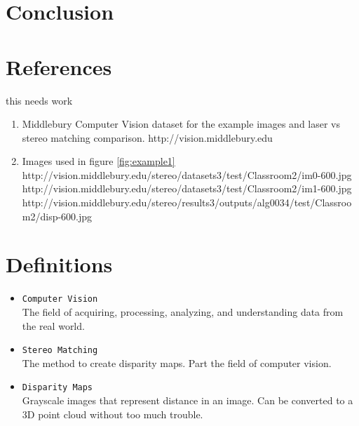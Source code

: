 \documentclass[11pt,fleqn]{article}
\begin{document}
\section{Conclusion}

\newpage
\begin{appendices}

\section{References}

this needs work

\begin{enumerate}

\item Middlebury Computer Vision dataset for the example images and laser vs stereo matching comparison.  
\small
http://vision.middlebury.edu
\normalsize

\item Images used in figure \ref{fig:example1}\\  
\small
http://vision.middlebury.edu/stereo/datasets3/test/Classroom2/im0-600.jpg\\
http://vision.middlebury.edu/stereo/datasets3/test/Classroom2/im1-600.jpg\\
http://vision.middlebury.edu/stereo/results3/outputs/alg0034/test/Classroom2/disp-600.jpg
\normalsize

\end{enumerate}


\section{Definitions}
\begin{itemize}
\item \texttt{Computer Vision}\\[2pt]
The field of acquiring, processing, analyzing, and understanding data from the real world.

\item \texttt{Stereo Matching}\\[2pt]
The method to create disparity maps. Part the field of computer vision.

\item \texttt{Disparity Maps}\\[2pt]
Grayscale images that represent distance in an image. Can be converted to a 3D point cloud without too much trouble.
\end{itemize}

\end{appendices}
\end{document}
